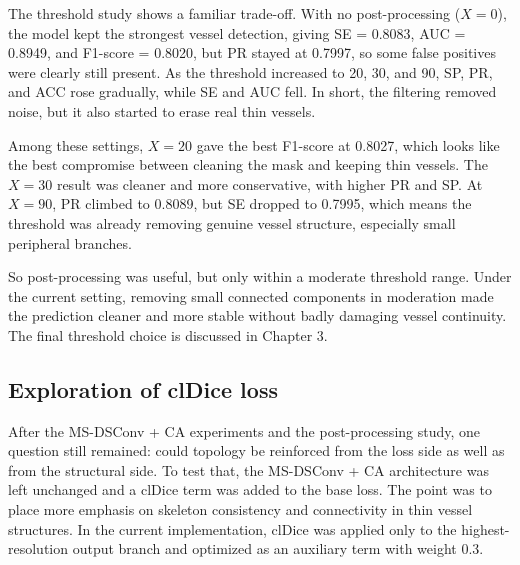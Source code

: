 \documentclass[a4paper,12pt]{article}
\begin{document}
\begin{table}[htbp]
\centering
\caption{Comparison of MS-DSConv + CA under different post-processing thresholds}
\label{tab:postprocess_en}
\end{table}

The threshold study shows a familiar trade-off. With no post-processing (\(X=0\)), the model kept the strongest vessel detection, giving SE = 0.8083, AUC = 0.8949, and F1-score = 0.8020, but PR stayed at 0.7997, so some false positives were clearly still present. As the threshold increased to 20, 30, and 90, SP, PR, and ACC rose gradually, while SE and AUC fell. In short, the filtering removed noise, but it also started to erase real thin vessels.

Among these settings, \(X=20\) gave the best F1-score at 0.8027, which looks like the best compromise between cleaning the mask and keeping thin vessels. The \(X=30\) result was cleaner and more conservative, with higher PR and SP. At \(X=90\), PR climbed to 0.8089, but SE dropped to 0.7995, which means the threshold was already removing genuine vessel structure, especially small peripheral branches.

So post-processing was useful, but only within a moderate threshold range. Under the current setting, removing small connected components in moderation made the prediction cleaner and more stable without badly damaging vessel continuity. The final threshold choice is discussed in Chapter 3.

\subsection{Exploration of clDice loss}

After the MS-DSConv + CA experiments and the post-processing study, one question still remained: could topology be reinforced from the loss side as well as from the structural side. To test that, the MS-DSConv + CA architecture was left unchanged and a clDice term was added to the base loss. The point was to place more emphasis on skeleton consistency and connectivity in thin vessel structures. In the current implementation, clDice was applied only to the highest-resolution output branch and optimized as an auxiliary term with weight 0.3.
\end{document}
